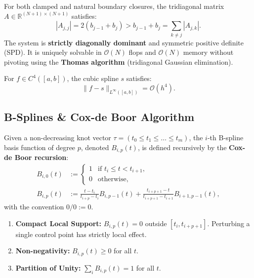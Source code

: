 \begin{theorem}
    For both clamped and natural boundary closures, the tridiagonal matrix $A \in \mathbb{R}^{(N+1) \times (N+1)}$ satisfies:
    \begin{equation}
        |A_{j,j}| = 2(b_{j-1} + b_j) > b_{j-1} + b_j = \sum_{k \neq j} |A_{j,k}|.
    \end{equation}
    The system is \textbf{strictly diagonally dominant} and symmetric positive definite (SPD). It is uniquely solvable in $\mathcal{O}(N)$ flops and $\mathcal{O}(N)$ memory without pivoting using the \textbf{Thomas algorithm} (tridiagonal Gaussian elimination).
\end{theorem}

\begin{theorem}
    For $f \in C^4([a, b])$, the cubic spline $s$ satisfies:
    \begin{equation}
        \|f - s\|_{L^\infty([a, b])} = \mathcal{O}(h^4).
    \end{equation}
\end{theorem}

\subsection{B-Splines \& Cox-de Boor Algorithm}

\begin{definition}
    Given a non-decreasing knot vector $\tau = (t_0 \le t_1 \le \dots \le t_m)$, the $i$-th B-spline basis function of degree $p$, denoted $B_{i,p}(t)$, is defined recursively by the \textbf{Cox-de Boor recursion}:
    \begin{align}
        B_{i,0}(t) &:= \begin{cases} 1 & \text{if } t_i \le t < t_{i+1}, \\ 0 & \text{otherwise}, \end{cases} \\
        B_{i,p}(t) &:= \frac{t - t_i}{t_{i+p} - t_i} B_{i,p-1}(t) + \frac{t_{i+p+1} - t}{t_{i+p+1} - t_{i+1}} B_{i+1,p-1}(t),
    \end{align}
    with the convention $0/0 := 0$.
\end{definition}

\begin{theorem}
    \begin{enumerate}
        \item \textbf{Compact Local Support:} $B_{i,p}(t) = 0$ outside $[t_i, t_{i+p+1}]$. Perturbing a single control point has strictly local effect.
        \item \textbf{Non-negativity:} $B_{i,p}(t) \ge 0$ for all $t$.
        \item \textbf{Partition of Unity:} $\sum_i B_{i,p}(t) = 1$ for all $t$.
    \end{enumerate}
\end{theorem}

